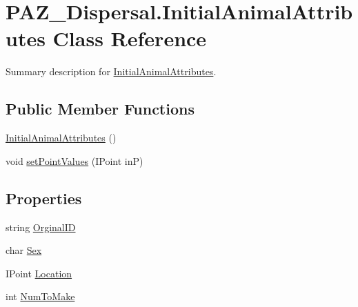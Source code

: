 \hypertarget{class_p_a_z___dispersal_1_1_initial_animal_attributes}{\section{P\-A\-Z\-\_\-\-Dispersal.\-Initial\-Animal\-Attributes Class Reference}
\label{class_p_a_z___dispersal_1_1_initial_animal_attributes}
}


Summary description for \hyperlink{class_p_a_z___dispersal_1_1_initial_animal_attributes}{Initial\-Animal\-Attributes}.  


\subsection*{Public Member Functions}
\begin{DoxyCompactItemize}
\item 
\hyperlink{class_p_a_z___dispersal_1_1_initial_animal_attributes_a49aebebc9fd867e949ebdda652bea398}{Initial\-Animal\-Attributes} ()
\item 
void \hyperlink{class_p_a_z___dispersal_1_1_initial_animal_attributes_a38d098a0e9d03e77b38b5cfcf6f59159}{set\-Point\-Values} (I\-Point in\-P)
\end{DoxyCompactItemize}
\subsection*{Properties}
\begin{DoxyCompactItemize}
\item 
string \hyperlink{class_p_a_z___dispersal_1_1_initial_animal_attributes_a79ec719e76dd0950c3278f104c8e4c19}{Orginal\-I\-D}
\item 
char \hyperlink{class_p_a_z___dispersal_1_1_initial_animal_attributes_accb60dfed8b0f4f2978de5486a40e42b}{Sex}
\item 
I\-Point \hyperlink{class_p_a_z___dispersal_1_1_initial_animal_attributes_a4125af2df53d2b291496687c1397574f}{Location}
\item 
int \hyperlink{class_p_a_z___dispersal_1_1_initial_animal_attributes_ace451c57604a706cfff6da143803cef6}{Num\-To\-Make}
\end{DoxyCompactItemize}



